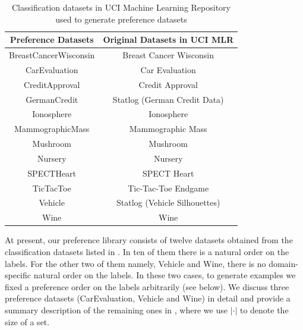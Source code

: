 \begin{table}
        \centering
        \small
        \begin{tabular}{ |c||c| }
                \hline
                Preference Datasets    & Original Datasets in UCI MLR \\
                \hline \hline
                BreastCancerWisconsin  & Breast Cancer Wisconsin \\
                \hline
                CarEvaluation          & Car Evaluation \\
                \hline
                CreditApproval         & Credit Approval \\
                \hline
                GermanCredit           & Statlog (German Credit Data) \\
                \hline
                Ionosphere             & Ionosphere \\
                \hline
                MammographicMass       & Mammographic Mass \\
                \hline
                Mushroom               & Mushroom \\
                \hline
                Nursery                & Nursery \\
                \hline
                SPECTHeart             & SPECT Heart \\
                \hline
                TicTacToe              & Tic-Tac-Toe Endgame \\
                \hline
                Vehicle                & Statlog (Vehicle Silhouettes) \\
                \hline
                Wine                   & Wine \\
                \hline
        \end{tabular}
        \caption{Classification datasets in UCI Machine Learning Repository 
								 used to generate preference datasets}
        \label{tbl:class}
\end{table}


At present, our preference library consists of twelve datasets obtained 
from the classification datasets listed in . 
In ten of them %
there is a natural order on the labels. 
For the other two of them namely, Vehicle and Wine, 
there is no domain-specific natural order on the labels. In these two cases, 
to generate examples we fixed a preference order on the labels arbitrarily 
(see below).
We discuss three preference datasets (CarEvaluation, Vehicle and Wine) 
in detail and provide a summary description
of the remaining ones in , where
we use $|\cdot|$ to denote the size of a set.

